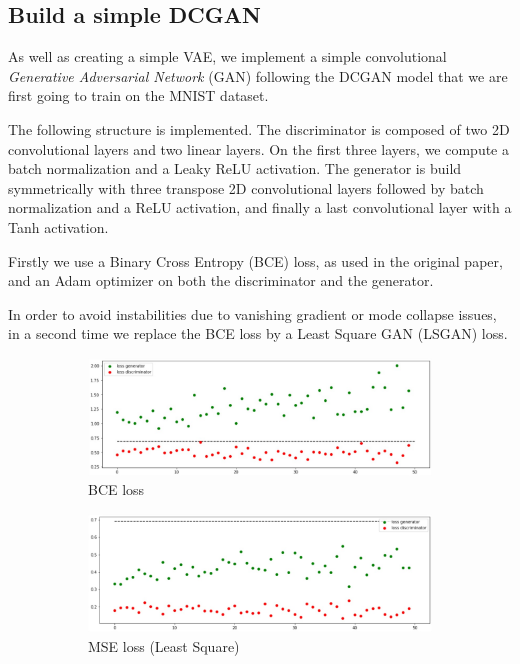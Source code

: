 \subsection{Build a simple DCGAN}

As well as creating a simple VAE, we implement a simple convolutional \textit{Generative Adversarial Network} (GAN) following the DCGAN model that we are first going to train on the MNIST dataset.

The following structure is implemented. The discriminator is composed of two 2D convolutional layers and two linear layers. On the first three layers, we compute a batch normalization and a Leaky ReLU activation. The generator is build symmetrically with three transpose 2D convolutional layers followed by batch normalization and a ReLU activation, and finally a last convolutional layer with a Tanh activation. 

Firstly we use a Binary Cross Entropy (BCE) loss, as used in the original paper, and an Adam optimizer on both the discriminator and the generator. 

In order to avoid instabilities due to vanishing gradient or mode collapse issues, in a second time we replace the BCE loss by a Least Square GAN (LSGAN) loss. 

\begin{figure}
    \centering
    \begin{subfigure}[b]{\textwidth}
        \includegraphics[width=\linewidth]{simple_dcgan/loss_BCE.jpg}
        \caption{BCE loss}
    \end{subfigure}
    \begin{subfigure}[b]{\textwidth}
        \includegraphics[width=\linewidth]{simple_dcgan/loss_MSE.jpg}
        \caption{MSE loss (Least Square)}
    \end{subfigure}
    \caption{}
    \label{fig:my_label}
\end{figure}
